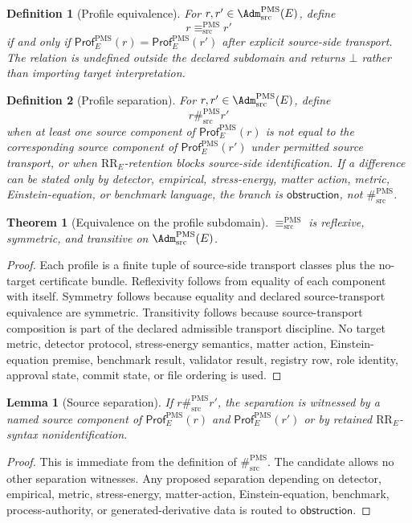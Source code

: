\documentclass[11pt]{article}
\newcommand{\EqProf}{\equiv^{\mathrm{PMS}}_{\mathrm{src}}}
\newcommand{\SepProf}{\#^{\mathrm{PMS}}_{\mathrm{src}}}
\newcommand{\Bottom}{\bot}
\newcommand{\Obstruction}{\mathsf{obstruction}}
\newcommand{\RRE}{\mathrm{RR}_E}
\newcommand{\Prof}{\mathsf{Prof}^{\mathrm{PMS}}_E}
\newtheorem{definition}{Definition}
\newtheorem{lemma}{Lemma}
\newtheorem{theorem}{Theorem}
\begin{document}
\begin{definition}[Profile equivalence]
For \(r,r'\in\Adm^{\mathrm{PMS}}_{\mathrm{src}}(E)\), define
\[
  r\EqProf r'
\]
if and only if \(\Prof(r)=\Prof(r')\) after explicit source-side transport.
The relation is undefined outside the declared subdomain and returns
\(\Bottom\) rather than importing target interpretation.
\end{definition}

\begin{definition}[Profile separation]
For \(r,r'\in\Adm^{\mathrm{PMS}}_{\mathrm{src}}(E)\), define
\[
  r\SepProf r'
\]
when at least one source component of \(\Prof(r)\) is not equal to the
corresponding source component of \(\Prof(r')\) under permitted source
transport, or when \(\RRE\)-retention blocks source-side identification. If a
difference can be stated only by detector, empirical, stress-energy, matter
action, metric, Einstein-equation, or benchmark language, the branch is
\(\Obstruction\), not \(\SepProf\).
\end{definition}

\begin{theorem}[Equivalence on the profile subdomain]
\(\EqProf\) is reflexive, symmetric, and transitive on
\(\Adm^{\mathrm{PMS}}_{\mathrm{src}}(E)\).
\end{theorem}

\begin{proof}
Each profile is a finite tuple of source-side transport classes plus the
no-target certificate bundle. Reflexivity follows from equality of each
component with itself. Symmetry follows because equality and declared
source-transport equivalence are symmetric. Transitivity follows because
source-transport composition is part of the declared admissible transport
discipline. No target metric, detector protocol, stress-energy semantics,
matter action, Einstein-equation premise, benchmark result, validator result,
registry row, role identity, approval state, commit state, or file ordering is
used.
\end{proof}

\begin{lemma}[Source separation]
If \(r\SepProf r'\), the separation is witnessed by a named source component
of \(\Prof(r)\) and \(\Prof(r')\) or by retained \(\RRE\)-syntax
nonidentification.
\end{lemma}

\begin{proof}
This is immediate from the definition of \(\SepProf\). The candidate allows no
other separation witnesses. Any proposed separation depending on detector,
empirical, metric, stress-energy, matter-action, Einstein-equation, benchmark,
process-authority, or generated-derivative data is routed to
\(\Obstruction\).
\end{proof}
\end{document}

